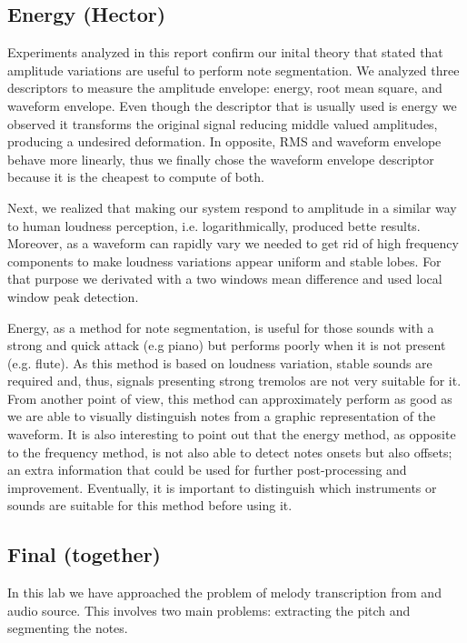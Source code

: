 \documentclass{article}
\begin{document}
\subsection{Energy (Hector)}

Experiments analyzed in this report confirm our inital theory that stated that amplitude variations are useful to perform note segmentation.
We analyzed three descriptors to measure the amplitude envelope: energy, root mean square, and waveform envelope.
Even though the descriptor that is usually used is energy we observed it transforms the original signal reducing middle valued amplitudes,
producing a undesired deformation.
In opposite, RMS and waveform envelope behave more linearly, thus we finally chose the waveform envelope descriptor because it is
the cheapest to compute of both.

Next, we realized that making our system respond to amplitude in a similar way to human loudness perception, i.e. logarithmically, produced bette results.
Moreover, as a waveform can rapidly vary we needed to get rid of high frequency components to make loudness variations appear uniform and stable lobes.
For that purpose we derivated with a two windows mean difference and used local window peak detection.

Energy, as a method for note segmentation, is useful for those sounds with a strong and quick attack (e.g piano)
but performs poorly when it is not present (e.g. flute).
As this method is based on loudness variation, stable sounds are required and, thus, signals presenting strong tremolos are not very suitable for it.
From another point of view, this method can approximately perform as good as we are able to visually distinguish notes from a graphic representation of the waveform.
It is also interesting to point out that the energy method, as opposite to the frequency method, is not also able to detect notes onsets
but also offsets; an extra information that could be used for further post-processing and improvement.
Eventually, it is important to distinguish which instruments or sounds are suitable for this method before using it.

\subsection{Final (together)}

In this lab we have approached the problem of melody transcription from and audio source. 
This involves two main problems: extracting the pitch and segmenting the notes.
\end{document}
